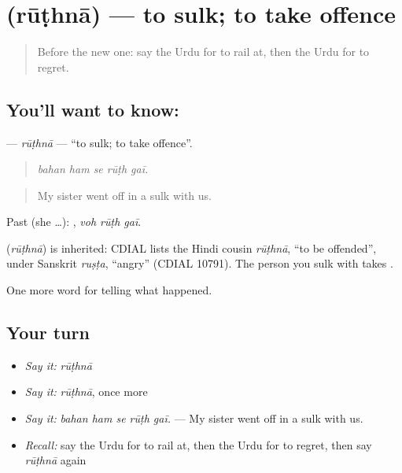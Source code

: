\section[\texorpdfstring{\ur{روٹھنا} (rūṭhnā)}{روٹھنا (rūṭhnā)}]{ (rūṭhnā) — to sulk; to take offence}

\label{lesson:UR-C326-ruthna}



\begin{quote}
Before the new one: say the Urdu for to rail at, then the Urdu for to regret.
\end{quote}

\subsection*{You'll want to know: }
\textbf{} — \emph{rūṭhnā} — \textquotedblleft{}to sulk; to take offence\textquotedblright{}.

\begin{quote}
    
\end{quote}

\begin{quote}
\emph{bahan ham se rūṭh gaī.}
\end{quote}

\begin{quote}
My sister went off in a sulk with us.
\end{quote}

Past (she …):   , \emph{voh rūṭh gaī}.

\begin{cousinweb}
\textbf{} (\emph{rūṭhnā}) is inherited: CDIAL lists the Hindi cousin \emph{rūṭhnā}, \textquotedblleft{}to be offended\textquotedblright{}, under Sanskrit \emph{ruṣṭa}, \textquotedblleft{}angry\textquotedblright{} (CDIAL 10791). The person you sulk with takes \textbf{}.
\end{cousinweb}

\begin{grammarlens}[title={What you've built}]
One more word for telling what happened.
\end{grammarlens}

\subsection*{Your turn}
\begin{itemize}
\raggedright
  \item \emph{Say it:} \emph{rūṭhnā}
  \item \emph{Say it:} \emph{rūṭhnā}, once more
  \item \emph{Say it:} \emph{bahan ham se rūṭh gaī.} — My sister went off in a sulk with us.
  \item \emph{Recall:} say the Urdu for to rail at, then the Urdu for to regret, then say \emph{rūṭhnā} again
\end{itemize}

